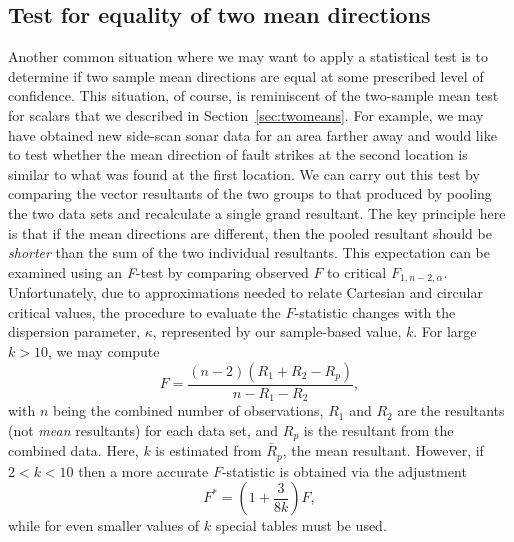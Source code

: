 \subsection{Test for equality of two mean directions}
\label{sec:twoDdir}
	Another common situation where we may want to apply a statistical test is to determine if two 
sample mean directions are equal at some prescribed level of confidence.  This situation, of course, is
reminiscent of the two-sample mean test for scalars that we described in Section~\ref{sec:twomeans}. For example, we may 
have obtained new side-scan sonar data for an area farther away and would like to test whether the 
mean direction of fault strikes at the second location is similar to what was found at the first location.
We can carry out this 
test by comparing the vector resultants of the two groups to that produced by pooling the
two data sets and recalculate a single grand resultant.  The key principle here
is that if the mean directions are different, then the pooled resultant should be \emph{shorter} than
the sum of the two individual resultants.  This expectation can be examined using an \emph{F}-test by
comparing observed $F$ to critical $F_{1,n-2,\alpha}$.  Unfortunately,
due to approximations needed to relate Cartesian and circular critical values, the procedure to evaluate
the $F$-statistic changes with the dispersion parameter, $\kappa$, represented by our sample-based value, $k$.
For large $k > 10$, we may compute
\begin{equation}
F = \frac{(n-2)(R_1 + R_2 - R_p)}{n - R_1 -R_2},
\end{equation}
with $n$ being the combined number of observations, $R_1$ and $R_2$ are the resultants (not \emph{mean} resultants)
for each data set, and
$R_p$ is the resultant from the combined data. Here, $k$ is estimated from $\bar{R}_p$, the mean resultant.
However, if $2 < k < 10$ then a more accurate $F$-statistic is obtained via the adjustment
\begin{equation}
F^{\ast} = \left(1 + \frac{3}{8k} \right) F,
\label{eq:betterFk}
\end{equation}
while for even smaller values of $k$ special tables must be used.
